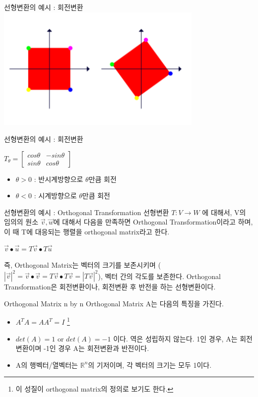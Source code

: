 \documentclass{beamer}
\begin{document}
\begin{frame}{선형변환의 예시 : 회전변환} 
\includegraphics[width=10cm,keepaspectratio]{rotation}

\end{frame}

\begin{frame}{선형변환의 예시 : 회전변환}

$T_{\theta} = 
\left[ \begin{matrix}
cos \theta & - sin \theta  \\
sin \theta & cos \theta 
\end{matrix} \right] $


\begin{itemize} 
\item $\theta>0$ : 반시계방향으로 $\theta$만큼 회전
\item $\theta<0$ : 시계방향으로 $\theta$만큼 회전
\end{itemize}
\end{frame}



\begin{frame}{선형변환의 예시 : Orthogonal Transformation}
선형변환 $T : V \rightarrow W$ 에 대해서, V의 임의의 원소 $\vec{v}, \vec{w}$에 대해서 다음을 만족하면 Orthogonal Transformation이라고 하며, 이 때 T에 대응되는 행렬을 orthogonal matrix라고 한다. 

$\vec{v} \bullet \vec{u} = T\vec{v} \bullet T\vec{u}$ 

즉, Orthogonal Matrix는 벡터의 크기를 보존시키며 ($|\vec{v}|^2 = \vec{v} \bullet \vec{v} = T \vec{v} \bullet T \vec{v} = |T \vec{v}|^2$), 벡터 간의 각도를 보존한다. Orthogonal Transformation은 회전변환이나, 회전변환 후 반전을 하는 선형변환이다. 
\end{frame}

\begin{frame}{Orthogonal Matrix} 
n by n Orthogonal Matrix A는 다음의 특징을 가진다. 

\begin{itemize} 
\item $A^T A = A A^T = I$ \footnote{이 성질이 orthogonal matrix의 정의로 보기도 한다.}
\item $det(A) = 1$ or $det(A) = -1$ 이다. 역은 성립하지 않는다. 1인 경우, A는 회전변환이며 -1인 경우 A는 회전변환과 반전이다. 
\item A의 행벡터/열벡터는 $\mathds{R}^n$의 기저이며, 각 벡터의 크기는 모두 1이다. 
\end{itemize}
\end{frame}
\end{document}
